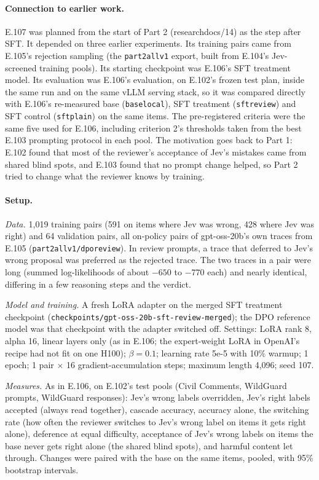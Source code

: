 \documentclass[11pt]{article}
\renewcommand{\_}{\origunderscore\allowbreak}
\begin{document}
\paragraph{Connection to earlier work.}
E.107 was planned from the start of Part 2 (research\_docs/14) as the step after SFT. It depended on three earlier experiments. Its training pairs came from E.105's rejection sampling (the \texttt{part2\_all\_v1} export, built from E.104's Jev-screened training pools). Its starting checkpoint was E.106's SFT treatment model. Its evaluation was E.106's evaluation, on E.102's frozen test plan, inside the same run and on the same vLLM serving stack, so it was compared directly with E.106's re-measured base (\texttt{base\_local}), SFT treatment (\texttt{sft\_review}) and SFT control (\texttt{sft\_plain}) on the same items. The pre-registered criteria were the same five used for E.106, including criterion 2's thresholds taken from the best E.103 prompting protocol in each pool. The motivation goes back to Part 1: E.102 found that most of the reviewer's acceptance of Jev's mistakes came from shared blind spots, and E.103 found that no prompt change helped, so Part 2 tried to change what the reviewer knows by training.

\paragraph{Setup.}
\emph{Data.} 1{,}019 training pairs (591 on items where Jev was wrong, 428 where Jev was right) and 64 validation pairs, all on-policy pairs of gpt-oss-20b's own traces from E.105 (\texttt{part2\_all\_v1/dpo\_review}). In review prompts, a trace that deferred to Jev's wrong proposal was preferred as the rejected trace. The two traces in a pair were long (summed log-likelihoods of about $-650$ to $-770$ each) and nearly identical, differing in a few reasoning steps and the verdict.

\emph{Model and training.} A fresh LoRA adapter on the merged SFT treatment checkpoint (\texttt{checkpoints/}\allowbreak\texttt{gpt-oss-20b-sft-review-merged}); the DPO reference model was that checkpoint with the adapter switched off. Settings: LoRA rank 8, alpha 16, linear layers only (as in E.106; the expert-weight LoRA in OpenAI's recipe had not fit on one H100); $\beta = 0.1$; learning rate 5e-5 with 10\% warmup; 1 epoch; 1 pair $\times$ 16 gradient-accumulation steps; maximum length 4{,}096; seed 107.

\emph{Measures.} As in E.106, on E.102's test pools (Civil Comments, WildGuard prompts, WildGuard responses): Jev's wrong labels overridden, Jev's right labels accepted (always read together), cascade accuracy, accuracy alone, the switching rate (how often the reviewer switches to Jev's wrong label on items it gets right alone), deference at equal difficulty, acceptance of Jev's wrong labels on items the base never gets right alone (the shared blind spots), and harmful content let through. Changes were paired with the base on the same items, pooled, with 95\% bootstrap intervals.
\end{document}
